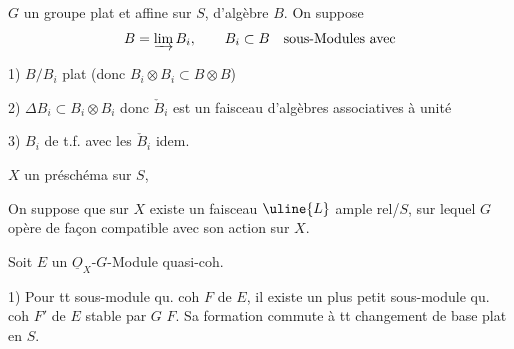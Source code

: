 
$G$ un groupe plat et affine sur $S$, d'algèbre $B$. On suppose
\[
B=\varinjlim B_i,\qquad B_i\subset B\quad\text{sous-Modules avec}
\]

1) $B/B_i$ plat (donc $B_i\otimes B_i\subset B\otimes B$)

2) $\Delta B_i\subset B_i\otimes B_i$ donc $\check B_i$ est un faisceau d'algèbres associatives à unité

3) $B_i$   de t.f. avec les $\check B_i$ idem.

$X$ un préschéma sur $S$,  

 On suppose que sur $X$ existe un faisceau  $\uline{L}$ ample rel/$S$, sur lequel $G$ opère de façon compatible avec son action sur $X$.

Soit $E$ un $\underline O_X$-$G$-Module quasi-coh. 

1) Pour tt sous-module qu. coh $F$ de $E$, il existe un plus petit sous-module qu. coh $F'$ de $E$  stable par $G$  $F$. Sa  formation commute à tt changement de base plat en $S$.


